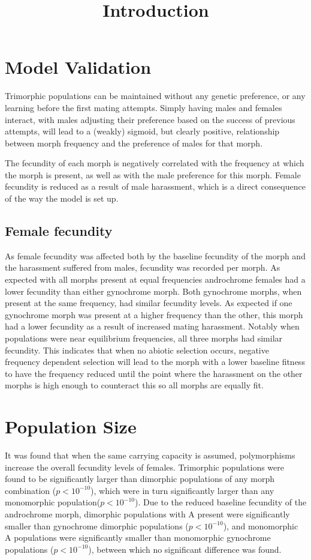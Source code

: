 \documentclass{article}
\title{Introduction}
\date{\vspace{-5ex}}
\begin{document}
\maketitle

\section{Model Validation}
Trimorphic populations can be maintained without any genetic preference, or any learning before the first mating attempts. Simply having males and females interact, with males adjusting their preference based on the success of previous attempts, will lead to a (weakly) sigmoid, but clearly positive, relationship between morph frequency and the preference of males for that morph.

The fecundity of each morph is negatively correlated with the frequency at which the morph is present, as well as with the male preference for this morph. Female fecundity is reduced as a result of male harassment, which is a direct consequence of the way the model is set up.

\subsection{Female fecundity}
As female fecundity was affected both by the baseline fecundity of the morph and the harassment suffered from males, fecundity was recorded per morph. As expected with all morphs present at equal frequencies androchrome females had a lower fecundity than either gynochrome morph. Both gynochrome morphs, when present at the same frequency, had similar fecundity levels. As expected if one gynochrome morph was present at a higher frequency than the other, this morph had a lower fecundity as a result of increased mating harassment. Notably when populations were near equilibrium frequencies, all three morphs had similar fecundity. This indicates that when no abiotic selection occurs, negative frequency dependent selection will lead to the morph with a lower baseline fitness to have the frequency reduced until the point where the harassment on the other morphs is high enough to counteract this so all morphs are equally fit.

\section{Population Size}
It was found that when the same carrying capacity is assumed, polymorphisms increase the overall fecundity levels of females. Trimorphic populations were found to be significantly larger than dimorphic populations of any morph combination ($p<10^{-10}$), which were in turn significantly larger than any monomorphic population($p<10^{-10}$). Due to the reduced baseline fecundity of the androchrome morph, dimorphic populations with A present were significantly smaller than gynochrome dimorphic populations ($p<10^{-10}$), and monomorphic A populations were significantly smaller than monomorphic gynochrome populations ($p<10^{-10}$), between which no significant difference was found.
\end{document}
